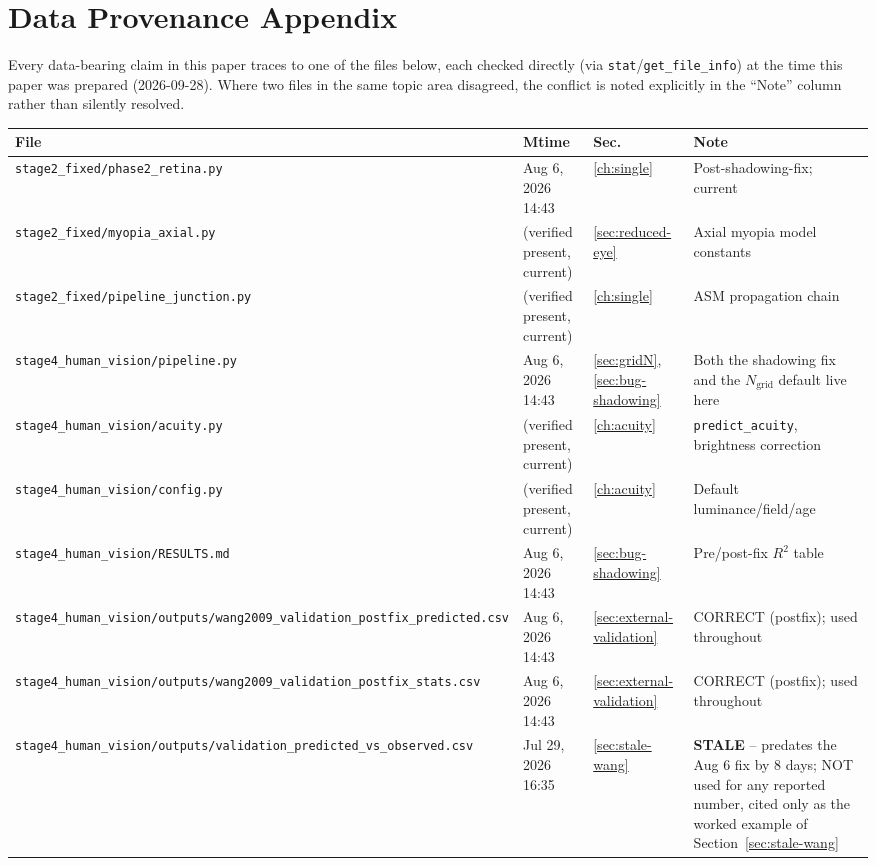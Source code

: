 \chapter{Data Provenance Appendix}
\label{ch:provenance}

Every data-bearing claim in this paper traces to one of the files below, each checked
directly (via \texttt{stat}/\texttt{get\_file\_info}) at the time this paper was
prepared (2026-09-28). Where two files in the same topic area disagreed, the conflict is
noted explicitly in the ``Note'' column rather than silently resolved.

\footnotesize
\begin{longtable}{p{5.8cm}p{2.4cm}p{1.2cm}p{5.4cm}}
\toprule
File & Mtime & Sec.\ & Note \\
\midrule
\endhead
\texttt{stage2\_fixed/phase2\_retina.py} & Aug 6, 2026 14:43 & \ref{ch:single} & Post-shadowing-fix; current \\
\texttt{stage2\_fixed/myopia\_axial.py} & (verified present, current) & \ref{sec:reduced-eye} & Axial myopia model constants \\
\texttt{stage2\_fixed/pipeline\_junction.py} & (verified present, current) & \ref{ch:single} & ASM propagation chain \\
\texttt{stage4\_human\_vision/pipeline.py} & Aug 6, 2026 14:43 & \ref{sec:gridN},\ref{sec:bug-shadowing} & Both the shadowing fix and the $N_{\mathrm{grid}}$ default live here \\
\texttt{stage4\_human\_vision/acuity.py} & (verified present, current) & \ref{ch:acuity} & \texttt{predict\_acuity}, brightness correction \\
\texttt{stage4\_human\_vision/config.py} & (verified present, current) & \ref{ch:acuity} & Default luminance/field/age \\
\texttt{stage4\_human\_vision/RESULTS.md} & Aug 6, 2026 14:43 & \ref{sec:bug-shadowing} & Pre/post-fix $R^2$ table \\
\texttt{stage4\_human\_vision/outputs/wang2009\_validation\_postfix\_predicted.csv} & Aug 6, 2026 14:43 & \ref{sec:external-validation} & CORRECT (postfix); used throughout \\
\texttt{stage4\_human\_vision/outputs/wang2009\_validation\_postfix\_stats.csv} & Aug 6, 2026 14:43 & \ref{sec:external-validation} & CORRECT (postfix); used throughout \\
\texttt{stage4\_human\_vision/outputs/validation\_predicted\_vs\_observed.csv} & Jul 29, 2026 16:35 & \ref{sec:stale-wang} & \textbf{STALE} -- predates the Aug 6 fix by 8 days; NOT used for any reported number, cited only as the worked example of Section~\ref{sec:stale-wang} \\

\end{longtable}
